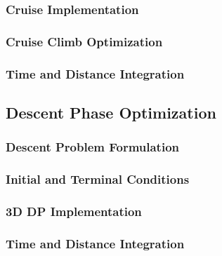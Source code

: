 \documentclass[12pt, a4paper]{report}
\begin{document}
\subsubsection{Cruise Implementation}


\subsubsection{Cruise Climb Optimization}


\subsubsection{Time and Distance Integration}

 
\subsection{Descent Phase Optimization}
\label{subsec:descent_phase}


\subsubsection{Descent Problem Formulation}


\subsubsection{Initial and Terminal Conditions}


\subsubsection{3D DP Implementation}


\subsubsection{Time and Distance Integration}

\end{document}
